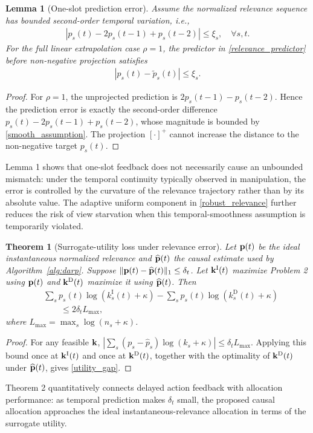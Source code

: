 \documentclass[lettersize,journal]{IEEEtran}
\theoremstyle{custom}
\newtheorem{Thm}{Theorem}
\newtheorem{Lem}{Lemma}
\begin{document}
\begin{Lem}[One-slot prediction error]
Assume the normalized relevance sequence has bounded second-order temporal variation, i.e.,
\begin{align}
    |p_s(t)-2p_s(t-1)+p_s(t-2)|\leq \xi_s, \quad \forall s,t.
    \label{smooth_assumption}
\end{align}
For the full linear extrapolation case $\rho=1$, the predictor in \eqref{relevance_predictor} before non-negative projection satisfies
\begin{align}
    |p_s(t)-\widetilde p_s(t)|\leq\xi_s.
    \label{prediction_bound}
\end{align}
\end{Lem}
\begin{proof}
For $\rho=1$, the unprojected prediction is $2p_s(t-1)-p_s(t-2)$. Hence the prediction error is exactly the second-order difference $p_s(t)-2p_s(t-1)+p_s(t-2)$, whose magnitude is bounded by \eqref{smooth_assumption}. The projection $[\cdot]^+$ cannot increase the distance to the non-negative target $p_s(t)$.
\end{proof}
Lemma 1 shows that one-slot feedback does not necessarily cause an unbounded mismatch: under the temporal continuity typically observed in manipulation, the error is controlled by the curvature of the relevance trajectory rather than by its absolute value. The adaptive uniform component in \eqref{robust_relevance} further reduces the risk of view starvation when this temporal-smoothness assumption is temporarily violated.

\begin{Thm}[Surrogate-utility loss under relevance error]
Let ${\bf p}(t)$ be the ideal instantaneous normalized relevance and $\widehat{\bf p}(t)$ the causal estimate used by Algorithm~\ref{alg:darp}. Suppose $\|{\bf p}(t)-\widehat{\bf p}(t)\|_1\leq\delta_t$. Let ${\bf k}^{\mathrm{I}}(t)$ maximize Problem 2 using ${\bf p}(t)$ and ${\bf k}^{\mathrm{D}}(t)$ maximize it using $\widehat{\bf p}(t)$. Then
\begin{align}
    &\sum_s p_s(t)\log(k_s^{\mathrm{I}}(t)+\kappa)
    -\sum_s p_s(t)\log(k_s^{\mathrm{D}}(t)+\kappa) \nonumber\\
    &\qquad\leq 2\delta_t L_{\max},
    \label{utility_gap}
\end{align}
where $L_{\max}=\max_s\log(n_s+\kappa)$.
\end{Thm}
\begin{proof}
For any feasible ${\bf k}$,
$|\sum_s(p_s-\widehat p_s)\log(k_s+\kappa)|\leq\delta_t L_{\max}$. Applying this bound once at ${\bf k}^{\mathrm{I}}(t)$ and once at ${\bf k}^{\mathrm{D}}(t)$, together with the optimality of ${\bf k}^{\mathrm{D}}(t)$ under $\widehat{\bf p}(t)$, gives \eqref{utility_gap}.
\end{proof}
Theorem 2 quantitatively connects delayed action feedback with allocation performance: as temporal prediction makes $\delta_t$ small, the proposed causal allocation approaches the ideal instantaneous-relevance allocation in terms of the surrogate utility.
\end{document}
